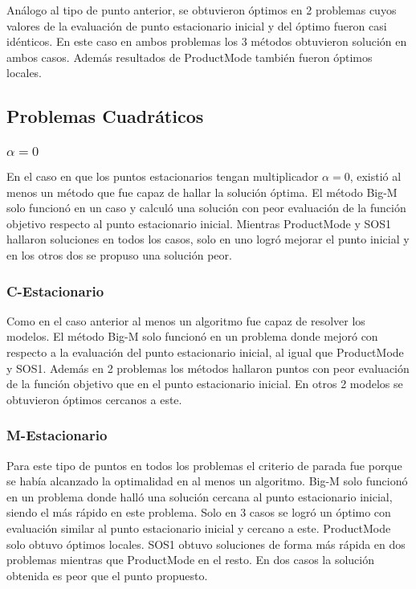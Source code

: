 Análogo al tipo de punto anterior, se obtuvieron óptimos en 2 problemas 
cuyos valores de la evaluación de punto estacionario inicial y del óptimo fueron casi idénticos. 
En este caso en ambos problemas los 3 métodos obtuvieron solución en ambos casos. 
 Además resultados de ProductMode también fueron óptimos locales.



\subsection{Problemas Cuadráticos}


\subsubsection{$\alpha =0$}
En el caso en que los puntos estacionarios tengan multiplicador $\alpha=0$, 
existió al menos un método que fue capaz de hallar la solución óptima. 
El método Big-M solo funcionó en un caso y calculó una solución con peor 
evaluación de la función objetivo respecto al punto estacionario inicial. 
Mientras ProductMode y SOS1 hallaron soluciones en todos los casos, 
solo en uno logró mejorar el punto inicial y en los otros dos se propuso una solución peor.
\subsubsection{C-Estacionario}   
Como en  el caso anterior al menos un algoritmo fue capaz de resolver los modelos. 
El método Big-M solo funcionó en un problema donde mejoró con respecto a la evaluación del punto estacionario inicial, al igual que  ProductMode y SOS1. Además en 2 problemas los métodos hallaron puntos con peor evaluación de la función objetivo que en el punto estacionario inicial. En otros 2 modelos se obtuvieron óptimos cercanos a este.



    
\subsubsection{M-Estacionario}
  
Para este tipo de puntos en todos los problemas el criterio de parada fue porque se había alcanzado la optimalidad en al menos un 
algoritmo.
Big-M solo funcionó en un problema donde halló una solución cercana al punto estacionario inicial, siendo el más rápido 
en este problema. Solo en 3 casos  se logró  un óptimo con evaluación  similar al punto estacionario inicial  y  cercano a este. 
ProductMode solo obtuvo óptimos locales. SOS1 obtuvo soluciones de forma más rápida en dos problemas mientras que ProductMode en el 
resto. En dos casos la solución obtenida es peor que el punto propuesto.
    
